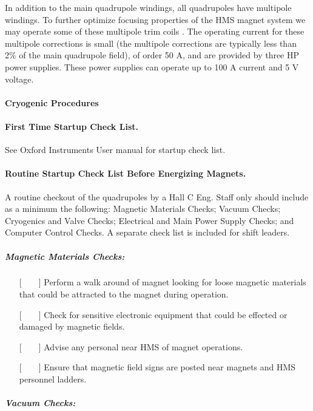 In addition to the main quadrupole windings, all quadrupoles have multipole
windings. To further optimize focusing properties of the HMS magnet system
we may operate some of these multipole trim coils
\cite{bi:yan2}.
The operating current for these multipole
corrections is small (the multipole corrections are typically less than
2\% of the main quadrupole field), of order 50 A, and are provided by
three HP power supplies. These power supplies can operate up to 100 A current
and 5 V voltage.


\paragraph{Cryogenic Procedures}

\paragraph {First Time Startup Check List.}

See Oxford Instruments User manual for startup check list. \cite{bi:oxf1}

\newpage
\paragraph {Routine Startup Check List Before Energizing Magnets.}

A routine checkout of the quadrupoles by a Hall C Eng. Staff only should include as a minimum
the following:  Magnetic Materials Checks; Vacuum Checks; Cryogenics
and Valve Checks; Electrical and Main Power Supply Checks; and
Computer Control Checks.  A separate check list is included for shift
leaders.  

\subparagraph{Magnetic Materials Checks:}

\begin{itemize}
\item[{[~~~~]}]{Perform a walk around of magnet looking for loose magnetic
materials that could be attracted to the magnet during operation.}
\item[{[~~~~]}]{Check for sensitive electronic equipment that could be
effected or damaged by magnetic fields.}
\item[{[~~~~]}]{Advise any personal near HMS of magnet operations.}
\item[{[~~~~]}]{Ensure that magnetic field signs are posted near magnets
and HMS personnel ladders.}
\end{itemize}


\subparagraph{Vacuum Checks:}

